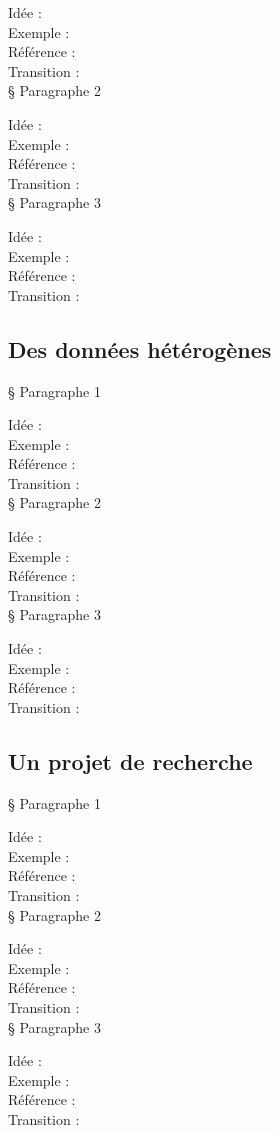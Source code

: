 Idée :\\
Exemple :\\
Référence :\\
Transition :\\

§ Paragraphe 2

Idée :\\
Exemple :\\
Référence :\\
Transition :\\

§ Paragraphe 3

Idée :\\
Exemple :\\
Référence :\\
Transition :\\

\subsection{Des données hétérogènes}

§ Paragraphe 1

Idée :\\
Exemple :\\
Référence :\\
Transition :\\

§ Paragraphe 2

Idée :\\
Exemple :\\
Référence :\\
Transition :\\

§ Paragraphe 3

Idée :\\
Exemple :\\
Référence :\\
Transition :\\

\subsection{Un projet de recherche}

§ Paragraphe 1

Idée :\\
Exemple :\\
Référence :\\
Transition :\\

§ Paragraphe 2

Idée :\\
Exemple :\\
Référence :\\
Transition :\\

§ Paragraphe 3

Idée :\\
Exemple :\\
Référence :\\
Transition :\\
